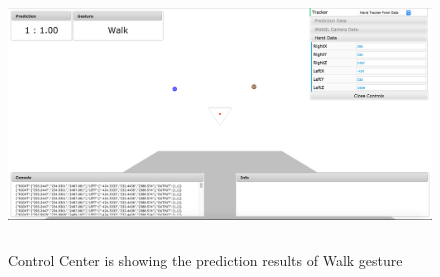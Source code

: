 \begin{figure}
	[h] \centering 
	\includegraphics[height=70mm]{figures/result/cc-walk.png} \caption{Control Center is showing the prediction results of Walk gesture} 
	\label{res:cc:walk}
\end{figure}

